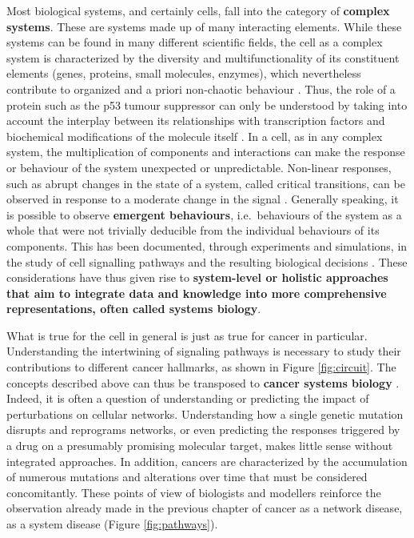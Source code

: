 \documentclass[a4paper,12pt,twoside,onecolumn,openright,final,oldfontcommands]{memoir}
\begin{document}
Most biological systems, and certainly cells, fall into the category of
\textbf{complex systems}. These are systems made up of many interacting
elements. While these systems can be found in many different scientific
fields, the cell as a complex system is characterized by the diversity
and multifunctionality of its constituent elements (genes, proteins,
small molecules, enzymes), which nevertheless contribute to organized
and a priori non-chaotic behaviour \citep{kitano2002computational}.
Thus, the role of a protein such as the p53 tumour suppressor can only
be understood by taking into account the interplay between its
relationships with transcription factors and biochemical modifications
of the molecule itself \citep{kitano2002computational}. In a cell, as in
any complex system, the multiplication of components and interactions
can make the response or behaviour of the system unexpected or
unpredictable. Non-linear responses, such as abrupt changes in the state
of a system, called critical transitions, can be observed in response to
a moderate change in the signal \citep{trefois2015critical}. Generally
speaking, it is possible to observe \textbf{emergent behaviours},
i.e.~behaviours of the system as a whole that were not trivially
deducible from the individual behaviours of its components. This has
been documented, through experiments and simulations, in the study of
cell signalling pathways and the resulting biological decisions
\citep{bhalla1999emergent, helikar2008emergent}. These considerations
have thus given rise to \textbf{system-level or holistic approaches that
aim to integrate data and knowledge into more comprehensive
representations, often called systems biology}.

What is true for the cell in general is just as true for cancer in
particular. Understanding the intertwining of signaling pathways is
necessary to study their contributions to different cancer hallmarks, as
shown in Figure \ref{fig:circuit}. The concepts described above can thus
be transposed to \textbf{cancer systems biology}
\citep{hornberg2006cancer, kreeger2010cancer, barillot2012computational}.
Indeed, it is often a question of understanding or predicting the impact
of perturbations on cellular networks. Understanding how a single
genetic mutation disrupts and reprograms networks, or even predicting
the responses triggered by a drug on a presumably promising molecular
target, makes little sense without integrated approaches. In addition,
cancers are characterized by the accumulation of numerous mutations and
alterations over time that must be considered concomitantly. These
points of view of biologists and modellers reinforce the observation
already made in the previous chapter of cancer as a network disease, as
a system disease (Figure \ref{fig:pathways}).
\end{document}
